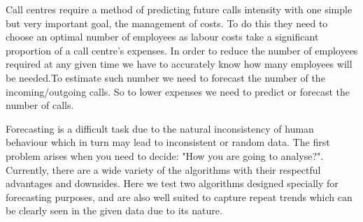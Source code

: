 \documentclass[12pt,a4paper]{article}
\theoremstyle{myplain}
\numberwithin{equation}{section}
\begin{document}

Call centres require a method of predicting future calls intensity with one simple but very important goal, the management of costs. To do this they need to choose an optimal number of employees as labour costs take a significant proportion of a call centre's expenses. In order to reduce the number of employees required at any given time we have to accurately know how many employees will be needed.To estimate such number we need to forecast the number of the incoming/outgoing calls. So to lower expenses we need to predict or forecast the number of calls.


Forecasting is a difficult task due to the natural inconsistency of human behaviour which in turn may lead to inconsistent or random data. The first problem arises when you need to decide: "How you are going to analyse?". Currently, there are a wide variety of the algorithms with their respectful advantages and downsides. Here we test two algorithms designed specially for forecasting purposes, and are also well suited to capture repeat trends which can be clearly seen in the given data due to its nature.

\end{document}

